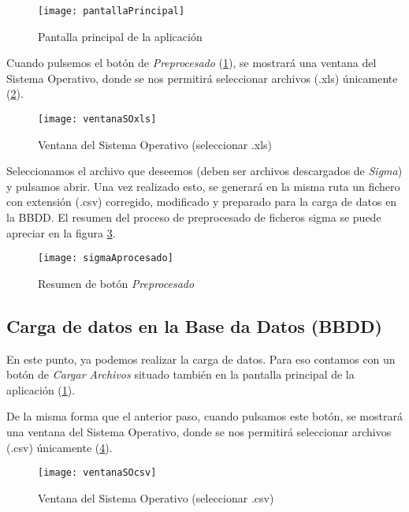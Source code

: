 \begin{figure}%
		\centering
		\texttt{[image: pantallaPrincipal]}
		\caption{Pantalla principal de la aplicación}\label{fig:pantallaPrincipal}
	\end{figure}


Cuando pulsemos el botón de \emph{Preprocesado} (\ref{fig:pantallaPrincipal}), se mostrará una ventana del Sistema Operativo, donde se nos permitirá seleccionar archivos (.xls) únicamente (\ref{fig:ventanaSOxls}).


\begin{figure}%
		\centering
		\texttt{[image: ventanaSOxls]}
		\caption{Ventana del Sistema Operativo (seleccionar .xls)}\label{fig:ventanaSOxls}
	\end{figure}


Seleccionamos el archivo que deseemos (deben ser archivos descargados de \emph{Sigma}) y pulsamos abrir.
Una vez realizado esto, se generará en la misma ruta un fichero con extensión (.csv) corregido, modificado y preparado para la carga de datos en la BBDD. El resumen del proceso de preprocesado de ficheros sigma se puede apreciar en la figura  \ref{fig:sigmaAprocesado}.

\begin{figure}%
		\centering
		\texttt{[image: sigmaAprocesado]}
		\caption{Resumen de botón \emph{Preprocesado}}\label{fig:sigmaAprocesado}
	\end{figure}


\subsection{Carga de datos en la Base da Datos (BBDD)}

En este punto, ya podemos realizar la carga de datos. Para eso contamos con un botón de \emph{Cargar Archivos} situado también en la pantalla principal de la aplicación (\ref{fig:pantallaPrincipal}).

De la misma forma que el anterior paso, cuando pulsamos este botón, se mostrará una ventana del Sistema Operativo, donde se nos permitirá seleccionar archivos (.csv) únicamente (\ref{fig:ventanaSOcsv}).

\begin{figure}%
		\centering
		\texttt{[image: ventanaSOcsv]}
		\caption{Ventana del Sistema Operativo (seleccionar .csv)}\label{fig:ventanaSOcsv}
	\end{figure}


